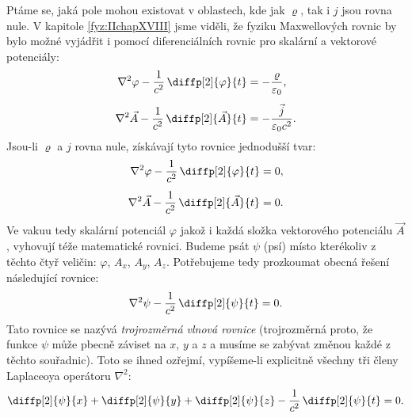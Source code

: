     Ptáme se, jaká pole mohou existovat v oblastech, kde jak \(\varrho\), tak i \(j\) jsou rovna
    nule. V kapitole \ref{fyz:IIchapXVIII} jsme viděli, že fyziku Maxwellových rovnic by bylo možné
    vyjádřit i pomocí diferenciálních rovnic pro skalární a vektorové potenciály:
    \begin{subequations}\label{fyz:eq967}
      \begin{align}      
        \nabla^2\varphi    - \dfrac{1}{c^2}\,\diffp[2]{\varphi}{t}
          &= -\dfrac{\varrho}{\varepsilon_0},      \label{fyz:eq967a} \\[1ex]     
        \nabla^2\vec{A} - \dfrac{1}{c^2}\,\diffp[2]{\vec{A}}{t}
          &= -\dfrac{\vec{j}}{\varepsilon_0c^2}.   \label{fyz:eq967b}
      \end{align}
    \end{subequations}
    Jsou-li \(\varrho\) a \(j\) rovna nule, získávají tyto rovnice jednodušší tvar:
    \begin{subequations}\label{fyz:eq968}
      \begin{align}      
        \nabla^2\varphi - \dfrac{1}{c^2}\,\diffp[2]{\varphi}{t}&= 0,   \label{fyz:eq968a} \\[1ex]     
        \nabla^2\vec{A} - \dfrac{1}{c^2}\,\diffp[2]{\vec{A}}{t}&= 0.   \label{fyz:eq968b}
      \end{align}
    \end{subequations}
    Ve vakuu tedy skalární potenciál \(\varphi\) jakož i každá složka vektorového potenciálu
    \(\vec{A}\), vyhovují téže matematické rovnici. Budeme psát \(\psi\) (psí) místo kterékoliv z
    těchto čtyř veličin: \(\varphi\), \(A_x\), \(A_y\), \(A_z\). Potřebujeme tedy prozkoumat obecná
    řešení následující rovnice:
    \begin{equation}\label{fyz:eq969}
      \nabla^2\psi - \dfrac{1}{c^2}\,\diffp[2]{\psi}{t}=0.
    \end{equation}
    Tato rovnice se nazývá \emph{trojrozměrná vlnová rovnice} (trojrozměrná proto, že funkce
    \(\psi\) může pbecně záviset na \(x\), \(y\) a \(z\) a musíme se zabývat změnou každé z těchto
    souřadnic). Toto se ihned ozřejmí, vypíšeme-li explicitně všechny tři členy Laplaceoya operátoru
    \(\nabla^2\):
    \begin{equation}\label{fyz:eq970}
      \diffp[2]{\psi}{x}+\diffp[2]{\psi}{y}+\diffp[2]{\psi}{z}-\frac{1}{c^2}\,\diffp[2]{\psi}{t}=0.
    \end{equation}

